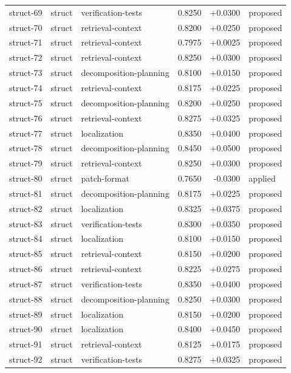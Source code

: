 \begin{center}
\begin{longtable}{llp{5.2cm}rrl}
struct-69 & struct & verification-tests & 0.8250 & +0.0300 & proposed \\
struct-70 & struct & retrieval-context & 0.8200 & +0.0250 & proposed \\
struct-71 & struct & retrieval-context & 0.7975 & +0.0025 & proposed \\
struct-72 & struct & retrieval-context & 0.8250 & +0.0300 & proposed \\
struct-73 & struct & decomposition-planning & 0.8100 & +0.0150 & proposed \\
struct-74 & struct & retrieval-context & 0.8175 & +0.0225 & proposed \\
struct-75 & struct & decomposition-planning & 0.8200 & +0.0250 & proposed \\
struct-76 & struct & retrieval-context & 0.8275 & +0.0325 & proposed \\
struct-77 & struct & localization & 0.8350 & +0.0400 & proposed \\
struct-78 & struct & decomposition-planning & 0.8450 & +0.0500 & proposed \\
struct-79 & struct & retrieval-context & 0.8250 & +0.0300 & proposed \\
struct-80 & struct & patch-format & 0.7650 & -0.0300 & applied \\
struct-81 & struct & decomposition-planning & 0.8175 & +0.0225 & proposed \\
struct-82 & struct & localization & 0.8325 & +0.0375 & proposed \\
struct-83 & struct & verification-tests & 0.8300 & +0.0350 & proposed \\
struct-84 & struct & localization & 0.8100 & +0.0150 & proposed \\
struct-85 & struct & retrieval-context & 0.8150 & +0.0200 & proposed \\
struct-86 & struct & retrieval-context & 0.8225 & +0.0275 & proposed \\
struct-87 & struct & verification-tests & 0.8350 & +0.0400 & proposed \\
struct-88 & struct & decomposition-planning & 0.8250 & +0.0300 & proposed \\
struct-89 & struct & localization & 0.8150 & +0.0200 & proposed \\
struct-90 & struct & localization & 0.8400 & +0.0450 & proposed \\
struct-91 & struct & retrieval-context & 0.8125 & +0.0175 & proposed \\
struct-92 & struct & verification-tests & 0.8275 & +0.0325 & proposed \\

\end{longtable}
\end{center}
